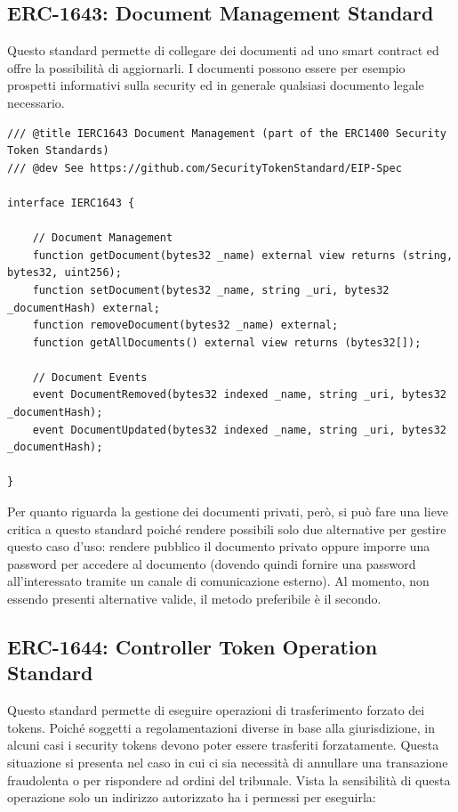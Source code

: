 \subsection{ERC-1643: Document Management Standard}
Questo standard permette di collegare dei documenti ad uno smart contract ed offre la possibilità di aggiornarli. I documenti possono essere per esempio prospetti informativi sulla security ed in generale qualsiasi documento legale necessario.
\begin{lstlisting}[language=Solidity,numbers=none]
/// @title IERC1643 Document Management (part of the ERC1400 Security Token Standards)
/// @dev See https://github.com/SecurityTokenStandard/EIP-Spec

interface IERC1643 {

    // Document Management
    function getDocument(bytes32 _name) external view returns (string, bytes32, uint256);
    function setDocument(bytes32 _name, string _uri, bytes32 _documentHash) external;
    function removeDocument(bytes32 _name) external;
    function getAllDocuments() external view returns (bytes32[]);

    // Document Events
    event DocumentRemoved(bytes32 indexed _name, string _uri, bytes32 _documentHash);
    event DocumentUpdated(bytes32 indexed _name, string _uri, bytes32 _documentHash);

}
\end{lstlisting}
Per quanto riguarda la gestione dei documenti privati, però, si può fare una lieve critica a questo standard poiché rendere possibili solo due alternative per gestire questo caso d'uso: rendere pubblico il documento privato oppure imporre una password per accedere al documento (dovendo quindi fornire una password all'interessato tramite un canale di comunicazione esterno). Al momento, non essendo presenti alternative valide, il metodo preferibile è il secondo. 

\subsection{ERC-1644: Controller Token Operation Standard}
Questo standard permette di eseguire operazioni di trasferimento forzato dei tokens. Poiché soggetti a regolamentazioni diverse in base alla giurisdizione, in alcuni casi i security tokens devono poter essere trasferiti forzatamente. Questa situazione si presenta nel caso in cui ci sia necessità di annullare una transazione fraudolenta o per rispondere ad ordini del tribunale. Vista la sensibilità di questa operazione solo un indirizzo autorizzato ha i permessi per eseguirla:

